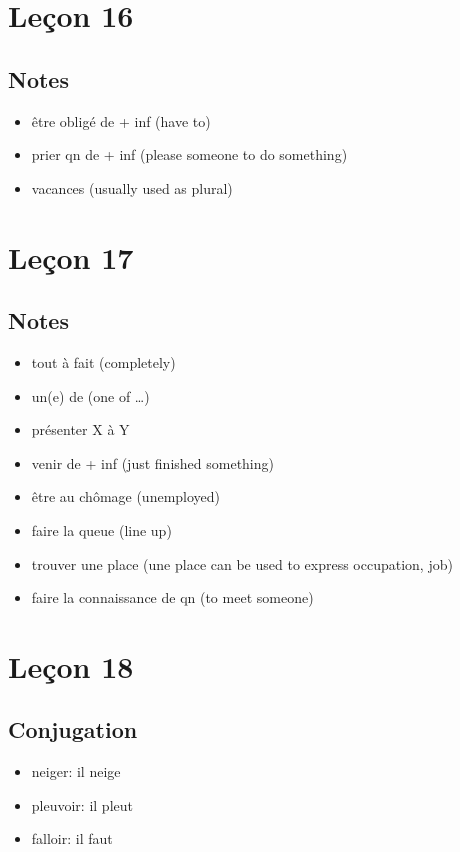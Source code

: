 \documentclass{book}
\begin{document}
\chapter{Leçon 16}
    \section{Notes}
        \begin{itemize}
            \item être obligé de + inf (have to)
            \item prier qn de + inf (please someone to do something)
            \item vacances (usually used as plural)
        \end{itemize}

\chapter{Leçon 17}
    \section{Notes}
        \begin{itemize}
            \item tout à fait (completely)
            \item un(e) de (one of \dots)
            \item présenter X à Y
            \item venir de + inf (just finished something)
            \item être au chômage (unemployed)
            \item faire la queue (line up)
            \item trouver une place (une place can be used to express occupation, job)
            \item faire la connaissance de qn (to meet someone)
        \end{itemize}

\chapter{Leçon 18}
    \section{Conjugation}
        \begin{itemize}
            \item neiger: il neige
            \item pleuvoir: il pleut
            \item falloir: il faut
        \end{itemize}
    
\end{document}
